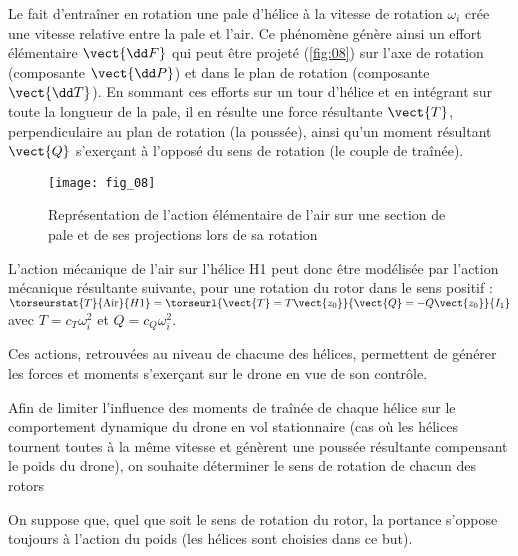 Le fait d’entraîner en rotation une pale d’hélice à la vitesse de rotation $\omega_i$ crée une vitesse
relative entre la pale et l’air. Ce phénomène génère ainsi un effort élémentaire $\vect{\dd F}$ qui peut
être projeté (\autoref{fig:08}) sur l’axe de rotation (composante $\vect{\dd P}$) et dans le plan de rotation (composante $\vect{\dd T}$).
En sommant ces efforts sur un tour d’hélice et en intégrant sur toute la longueur de la pale,
il en résulte une force résultante $\vect{T}$, perpendiculaire au plan de rotation (la poussée), ainsi
qu’un moment résultant $\vect{Q}$ s’exerçant à l’opposé du sens de rotation (le couple de traînée).


\begin{figure}[H]
\centering
\texttt{[image: fig\_08]}
\caption{\label{fig:08}  Représentation de l’action élémentaire de l’air sur une section de pale et de ses
projections lors de sa rotation}
\end{figure}

L’action mécanique de l’air sur l’hélice H1 peut donc être modélisée par l’action mécanique
résultante suivante, pour une rotation du rotor dans le sens positif : 
$\torseurstat{T}{\text{Air}}{H1} = \torseurl{\vect{T}=T\vect{z_0}}{\vect{Q}=-Q\vect{z_0}}{I_1}$
avec $T = c_T \omega_i^2$ et $Q=c_Q \omega_i^2$.


Ces actions, retrouvées au niveau de chacune des hélices, permettent de générer les forces
et moments s’exerçant sur le drone en vue de son contrôle.

Afin de limiter l’influence des moments de traînée de chaque hélice sur le comportement
dynamique du drone en vol stationnaire (cas où les hélices tournent toutes à la même vitesse
et génèrent une poussée résultante compensant le poids du drone), on souhaite déterminer
le sens de rotation de chacun des rotors


\begin{hypo}
On suppose que, quel que soit le sens de rotation du rotor, la portance s’oppose toujours à
l’action du poids (les hélices sont choisies dans ce but).
\end{hypo}

\ifprof
\begin{corrige}
\end{corrige}
\else
\fi

